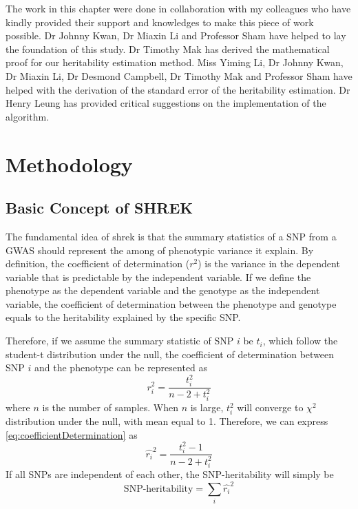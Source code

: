 \documentclass[12pt]{scrbook}
\begin{document}
The work in this chapter were done in collaboration with my colleagues who have kindly provided their support and knowledges to make this piece of work possible.
Dr Johnny Kwan, Dr Miaxin Li and Professor Sham have helped to lay the foundation of this study. 
Dr Timothy Mak has derived the mathematical proof for our heritability estimation method. 
Miss Yiming Li, Dr Johnny Kwan, Dr Miaxin Li, Dr Desmond Campbell, Dr Timothy Mak and Professor Sham have helped with the derivation of the standard error of the heritability estimation. 
Dr Henry Leung has provided critical suggestions on the implementation of the algorithm.

\section{Methodology}			
\subsection{Basic Concept of SHREK}
The fundamental idea of \gls{shrek} is that the summary statistics of a \gls{SNP} from a \gls{GWAS} should represent the among of phenotypic variance it explain.
By definition, the coefficient of determination ($r^2$) is the variance in the dependent variable that is predictable by the independent variable.
If we define the phenotype as the dependent variable and the genotype as the independent variable, the coefficient of determination between the phenotype and genotype equals to the heritability explained by the specific \gls{SNP}.

Therefore, if we assume the summary statistic of \gls{SNP} $i$ be $t_i$, which follow the student-t distribution under the null, the coefficient of determination between \gls{SNP} $i$ and the phenotype can be represented as 
\begin{equation}
r_i^2=\frac{t_i^2}{n-2+t_i^2}
\label{eq:coefficientDetermination}
\end{equation}
where $n$ is the number of samples.
When $n$ is large, $t_i^2$ will converge to $\chi^2$ distribution under the null, with mean equal to 1.
Therefore, we can express \cref{eq:coefficientDetermination} as
\begin{equation}
\hat{r_i}^2=\frac{t_i^2-1}{n-2+t_i^2}
\label{eq:cDShrek}
\end{equation}
If all \glspl{SNP} are independent of each other, the \gls{SNP}-heritability will simply be
\begin{equation}
\text{SNP-heritability}=\sum_i\hat{r_i}^2
\end{equation}
\end{document}
